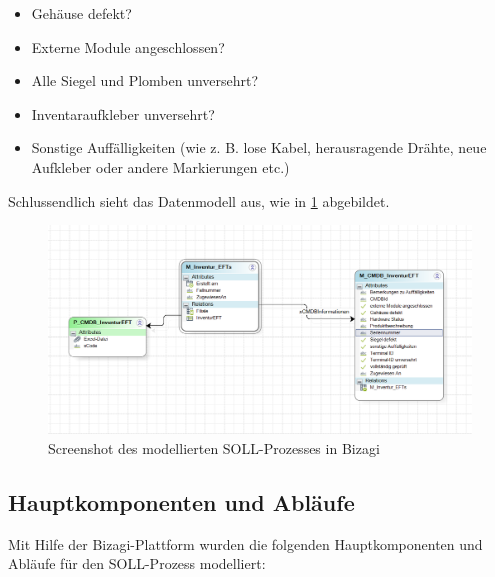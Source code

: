 \documentclass[12pt, a4paper]{article}
\begin{document}
\begin{itemize}
    \item Gehäuse defekt?
    \item Externe Module angeschlossen?
    \item Alle Siegel und Plomben unversehrt?
    \item Inventaraufkleber unversehrt?
    \item Sonstige Auffälligkeiten (wie z. B. lose Kabel, herausragende Drähte, neue Aufkleber oder andere Markierungen etc.)
\end{itemize}

Schlussendlich sieht das Datenmodell aus, wie in \ref{fig:data-model} abgebildet.

\begin{figure}[h]
    \centering
    \includegraphics[width=\textwidth]{images/data-model.png}
    \caption{Screenshot des modellierten SOLL-Prozesses in Bizagi}
    \label{fig:data-model}
\end{figure}
\newpage

\subsection{Hauptkomponenten und Abläufe}

Mit Hilfe der Bizagi-Plattform wurden die folgenden Hauptkomponenten und Abläufe für den SOLL-Prozess modelliert:
\end{document}
